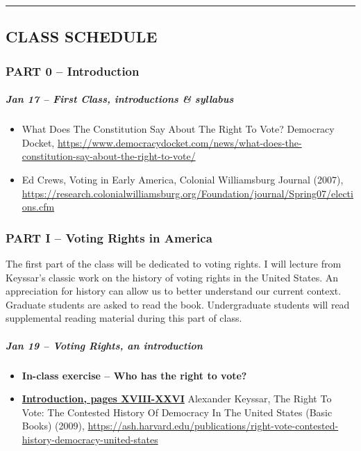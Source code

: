 \documentclass[
]{article}
\providecommand{\tightlist}{%
  \setlength{\itemsep}{0pt}\setlength{\parskip}{0pt}}
\begin{document}
\begin{center}\rule{0.5\linewidth}{0.5pt}\end{center}

\hypertarget{class-schedule}{%
\subsection{CLASS SCHEDULE}\label{class-schedule}}

\hypertarget{part-0-introduction}{%
\subsubsection{PART 0 -- Introduction}\label{part-0-introduction}}

\hypertarget{jan-17-first-class-introductions-syllabus}{%
\subparagraph{Jan 17 -- First Class, introductions \&
syllabus}\label{jan-17-first-class-introductions-syllabus}}

\begin{itemize}
\tightlist
\item
  What Does The Constitution Say About The Right To Vote? Democracy
  Docket,
  \url{https://www.democracydocket.com/news/what-does-the-constitution-say-about-the-right-to-vote/}
\item
  Ed Crews, Voting in Early America, Colonial Williamsburg Journal
  (2007),
  \url{https://research.colonialwilliamsburg.org/Foundation/journal/Spring07/elections.cfm}
\end{itemize}

\hypertarget{part-i-voting-rights-in-america}{%
\subsubsection{PART I -- Voting Rights in
America}\label{part-i-voting-rights-in-america}}

The first part of the class will be dedicated to voting rights. I will
lecture from Keyssar's classic work on the history of voting rights in
the United States. An appreciation for history can allow us to better
understand our current context. Graduate students are asked to read the
book. Undergraduate students will read supplemental reading material
during this part of class.

\hypertarget{jan-19-voting-rights-an-introduction}{%
\subparagraph{Jan 19 -- Voting Rights, an
introduction}\label{jan-19-voting-rights-an-introduction}}

\begin{itemize}
\tightlist
\item
  \textbf{In-class exercise -- Who has the right to vote?}
\item
  \href{https://drive.google.com/file/d/1tnQBW4MWurYs9tSOM0qLSWw4tyTrizfK/view?usp=sharing}{\textbf{Introduction,
  pages XVIII-XXVI}} Alexander Keyssar, The Right To Vote: The Contested
  History Of Democracy In The United States (Basic Books) (2009),
  \url{https://ash.harvard.edu/publications/right-vote-contested-history-democracy-united-states}
\end{itemize}
\end{document}
